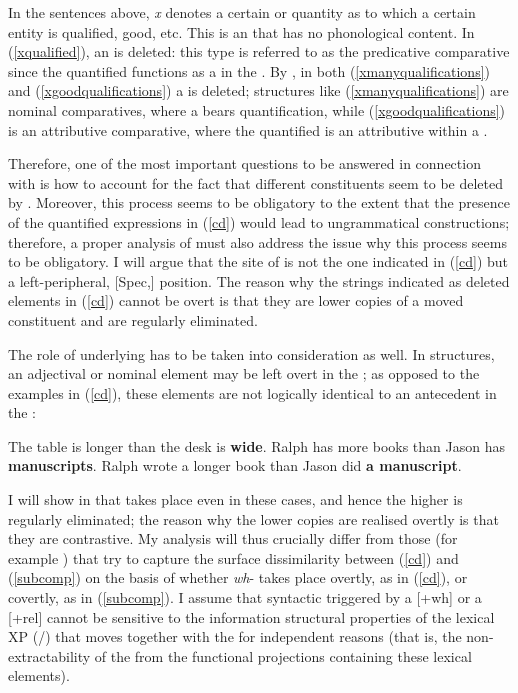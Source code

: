 In the sentences above, \textit{x} denotes a certain  or quantity as to which a certain entity is qualified, good, etc. This is an  that has no phonological content. In (\ref{xqualified}), an  is deleted: this type is referred to as the predicative comparative since the quantified  functions as a  in the . By , in both (\ref{xmanyqualifications}) and (\ref{xgoodqualifications}) a  is deleted; structures like (\ref{xmanyqualifications}) are nominal comparatives, where a  bears quantification, while (\ref{xgoodqualifications}) is an attributive comparative, where the quantified  is an attributive  within a .

Therefore, one of the most important questions to be answered in connection with  is how to account for the fact that different constituents seem to be deleted by . Moreover, this  process seems to be obligatory to the extent that the presence of the quantified expressions in (\ref{cd}) would lead to ungrammatical constructions; therefore, a proper analysis of  must also address the issue why this process seems to be obligatory. I will argue that the site of  is not the one indicated in (\ref{cd}) but a left-peripheral, [Spec,] position. The reason why the strings indicated as deleted elements in (\ref{cd}) cannot be overt is that they are lower copies of a moved constituent and are regularly eliminated.

The role of  underlying  has to be taken into consideration as well. In  structures, an adjectival or nominal element may be left overt in the ; as opposed to the examples in (\ref{cd}), these elements are not logically identical to an antecedent in the :

\ea \label{subcomp}
\ea	The table is longer than the desk is \textbf{wide}.
\ex	Ralph has more books than Jason has \textbf{manuscripts}.
\ex	Ralph wrote a longer book than Jason did \textbf{a manuscript}.
\z
\z

I will show in  that  takes place even in these cases, and hence the higher  is regularly eliminated; the reason why the lower copies are realised overtly is that they are contrastive. My analysis will thus crucially differ from those (for example \citealt{kennedy2002}) that try to capture the surface dissimilarity between (\ref{cd}) and (\ref{subcomp}) on the basis of whether \textit{wh}- takes place overtly, as in (\ref{cd}), or covertly, as in (\ref{subcomp}). I assume that syntactic  triggered by a [+wh] or a [+rel]  cannot be sensitive to the information structural properties of the lexical XP (/) that moves together with the  for independent reasons (that is, the non-extractability of the  from the functional projections containing these lexical elements).

